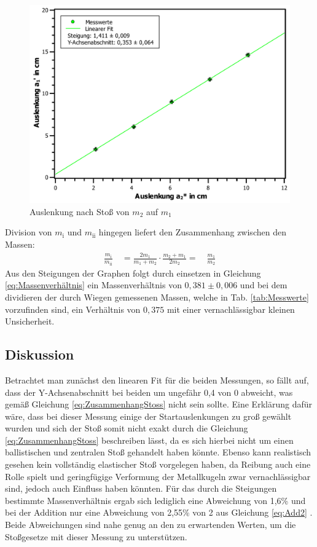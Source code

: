 			\begin{figure}[ht]
				\centering
				\includegraphics[width=\textwidth]{AuslenkungGross.pdf}
				\caption{Auslenkung nach Stoß von $m_2$ auf $m_1$}
				\label{abb:AuslenkungGross}	
			\end{figure}
		
			Division von $m_\text{i}$ und $m_\text{ii}$ hingegen liefert den Zusammenhang zwischen den Massen:
			\begin{align}
				\frac{m_\text{i}}{m_\text{ii}} \quad = \frac{2m_\text{1}}{m_\text{1}+m_\text{2}} \cdot \frac{m_\text{2}+m_\text{1}}{2m_\text{2}}
				= \quad  \frac{m_\text{1}}{m_\text{2}} \label{eq:Massenverhältnis}
			\end{align}
			Aus den Steigungen der Graphen folgt durch einsetzen in Gleichung \ref{eq:Massenverhältnis} ein Massenverhältnis von $0,381 \pm 0,006$ und bei dem dividieren der durch Wiegen gemessenen Massen, welche in Tab. \ref{tab:Messwerte} vorzufinden sind, ein Verhältnis von $0,375$ mit einer vernachlässigbar kleinen Unsicherheit.
			
	\subsection{Diskussion}
		
		Betrachtet man zunächst den linearen Fit für die beiden Messungen, so fällt auf, dass der Y-Achsenabschnitt bei beiden um ungefähr 0,4 von 0 abweicht, was gemäß Gleichung \ref{eq:ZusammenhangStoss} nicht sein sollte. Eine Erklärung dafür wäre, dass bei dieser Messung einige der Startauslenkungen zu groß gewählt wurden und sich der Stoß somit nicht exakt durch die Gleichung \ref{eq:ZusammenhangStoss} beschreiben lässt, da es sich hierbei nicht um einen ballistischen und zentralen Stoß gehandelt haben könnte. Ebenso kann realistisch gesehen kein vollständig elastischer Stoß vorgelegen haben, da Reibung auch eine Rolle spielt und geringfügige Verformung der Metallkugeln zwar vernachlässigbar sind, jedoch auch Einfluss haben könnten.
		Für das durch die Steigungen bestimmte Massenverhältnis ergab sich lediglich eine Abweichung von 1,6\% und bei der Addition nur eine Abweichung von 2,55\% von 2 aus Gleichung \ref{eq:Add2} . Beide Abweichungen sind nahe genug an den zu erwartenden Werten, um die Stoßgesetze mit dieser Messung zu unterstützen. 
		
